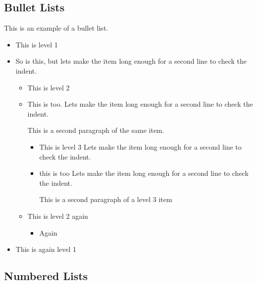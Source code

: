 \subsection{Bullet Lists}

This is an example of a bullet list.
\begin{itemize}
  \item This is level 1
  \item So is this, but lets make the item long enough for a second
        line to check the indent. 
  \begin{itemize}
    \item This is level 2
    \item This is too.  Lets make the item long enough for a second
          line to check the indent. 

          This is a second paragraph of the same item.
    \begin{itemize}
      \item This is level 3 Lets make the item long enough for a
            second line to check the indent.
      \item this is too Lets make the item long enough for a second
            line  to check the indent.

            This is a second paragraph of a level 3 item
    \end{itemize}
    \item This is level 2 again
    \begin{itemize}
      \item Again
    \end{itemize}
  \end{itemize}
  \item This is again level 1
\end{itemize}



\subsection{Numbered Lists}


